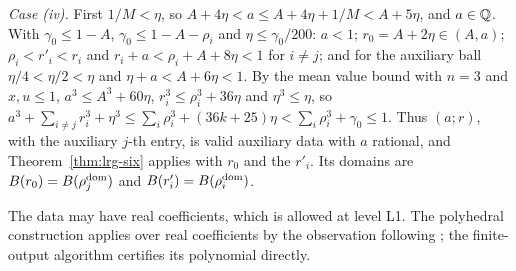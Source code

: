 \emph{Case (iv).} First $1/M<\eta$, so $A+4\eta<a\le A+4\eta+1/M<A+5\eta$, and $a\in\mathbb{Q}$. With $\gamma_0\le1-A$,
$\gamma_0\le1-A-\rho_i$ and $\eta\le\gamma_0/200$: $a<1$; $r_0=A+2\eta\in(A,a)$; $\rho_i<r'_i<r_i$ and
$r_i+a<\rho_i+A+8\eta<1$ for $i\ne j$; and for the auxiliary ball $\eta/4<\eta/2<\eta$ and $\eta+a<A+6\eta<1$. By the mean value
bound with $n=3$ and $x,u\le1$, $a^3\le A^3+60\eta$, $r_i^3\le\rho_i^3+36\eta$ and $\eta^3\le\eta$, so
$a^3+\sum_{i\ne j}r_i^3+\eta^3\le\sum_i\rho_i^3+(36k+25)\eta<\sum_i\rho_i^3+\gamma_0\le1$. Thus $(a;r)$, with the auxiliary $j$-th
entry, is valid auxiliary data with $a$ rational, and Theorem~\ref{thm:lrg-six} applies with $r_0$ and the $r'_i$. Its
domains are $B(r_0)=B(\rho_j^{\rm dom})$ and $B(r'_i)=B(\rho_i^{\rm dom})$.

The data may have real coefficients, which is allowed at level L1. The polyhedral construction applies over real
coefficients by the observation following ; the finite-output algorithm certifies
its polynomial directly.
